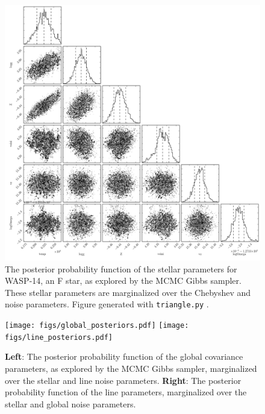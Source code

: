 \documentclass[iop,floatfix]{emulateapj}
\begin{document}
\begin{figure}[!htb]
\begin{center}
  \includegraphics[draft, width=5in]{figs/stellar_triangle.png}
  \caption{The posterior probability function of the stellar parameters for WASP-14, an F star, as explored by the MCMC Gibbs sampler. These stellar parameters are marginalized over the Chebyshev and noise parameters. Figure generated with \texttt{triangle.py} \citep{foreman-mackey14}.
}
\label{fig:stellar_posterior}
\end{center}
\end{figure}

\begin{figure}[!htb]
\begin{center}
  \texttt{[image: figs/global\_posteriors.pdf]}
  \texttt{[image: figs/line\_posteriors.pdf]}
  \caption{\textbf{Left}: The posterior probability function of the global covariance parameters, as explored by the MCMC Gibbs sampler, marginalized over the stellar and line noise parameters. \textbf{Right}: The posterior probability function of the line parameters, marginalized over the stellar and global noise parameters.}
\label{fig:noise_posterior}
\end{center}
\end{figure}
\end{document}
